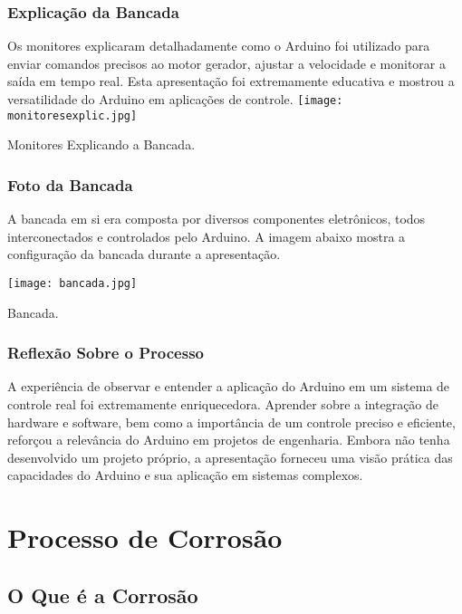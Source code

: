 \documentclass[
]{book}
\begin{document}
\subsection{Explicação da Bancada}\label{explicauxe7uxe3o-da-bancada}

Os monitores explicaram detalhadamente como o Arduino foi utilizado para enviar comandos precisos ao motor gerador, ajustar a velocidade e monitorar a saída em tempo real. Esta apresentação foi extremamente educativa e mostrou a versatilidade do Arduino em aplicações de controle.
\texttt{[image: monitoresexplic.jpg]}

Monitores Explicando a Bancada.

\subsection{Foto da Bancada}\label{foto-da-bancada}

A bancada em si era composta por diversos componentes eletrônicos, todos interconectados e controlados pelo Arduino. A imagem abaixo mostra a configuração da bancada durante a apresentação.

\texttt{[image: bancada.jpg]}

Bancada.

\subsection{Reflexão Sobre o Processo}\label{reflexuxe3o-sobre-o-processo-3}

A experiência de observar e entender a aplicação do Arduino em um sistema de controle real foi extremamente enriquecedora. Aprender sobre a integração de hardware e software, bem como a importância de um controle preciso e eficiente, reforçou a relevância do Arduino em projetos de engenharia. Embora não tenha desenvolvido um projeto próprio, a apresentação forneceu uma visão prática das capacidades do Arduino e sua aplicação em sistemas complexos.

\chapter{Processo de Corrosão}\label{processo-de-corrosuxe3o}

\section{O Que é a Corrosão}\label{o-que-uxe9-a-corrosuxe3o}
\end{document}
